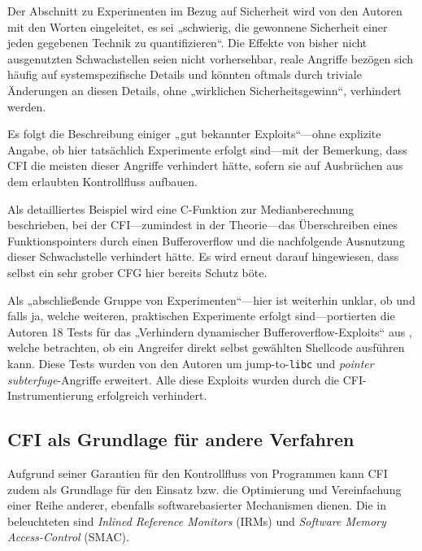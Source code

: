 \documentclass[11pt]{article}
\begin{document}
Der Abschnitt zu Experimenten im Bezug auf Sicherheit wird von den Autoren mit
den Worten eingeleitet, es sei „schwierig, die gewonnene Sicherheit einer jeden
gegebenen Technik zu quantifizieren“. Die Effekte von bisher nicht ausgenutzten
Schwachstellen seien nicht vorhersehbar, reale Angriffe bezögen sich häufig auf
systemspezifische Details und könnten oftmals durch triviale Änderungen an
diesen Details, ohne „wirklichen Sicherheitsgewinn“, verhindert werden.

Es folgt die Beschreibung einiger „gut bekannter Exploits“—ohne explizite
Angabe, ob hier tatsächlich Experimente erfolgt sind—mit der Bemerkung, dass
CFI die meisten dieser Angriffe verhindert hätte, sofern sie auf Ausbrüchen aus
dem erlaubten Kontrollfluss aufbauen.

Als detailliertes Beispiel wird eine C-Funktion zur Medianberechnung
beschrieben, bei der CFI—zumindest in der Theorie—das Überschreiben eines
Funktionspointers durch einen Bufferoverflow und die nachfolgende Ausnutzung
dieser Schwachstelle verhindert hätte. Es wird erneut darauf hingewiesen, dass
selbst ein sehr grober CFG hier bereits Schutz böte.

Als „abschließende Gruppe von Experimenten“—hier ist weiterhin unklar, ob und
falls ja, welche weiteren, praktischen Experimente erfolgt sind—portierten die
Autoren 18 Tests für das „Verhindern dynamischer Bufferoverflow-Exploits“ aus
\cite{wilander2003comparison}, welche betrachten, ob ein Angreifer direkt
selbst gewählten Shellcode ausführen kann. Diese Tests wurden von den Autoren
um jump-to-\texttt{libc} und \emph{pointer subterfuge}-Angriffe erweitert. Alle
diese Exploits wurden durch die CFI-Instrumentierung erfolgreich verhindert.

\subsection{CFI als Grundlage für andere Verfahren}

Aufgrund seiner Garantien für den Kontrollfluss von Programmen kann CFI zudem
als Grundlage für den Einsatz bzw. die Optimierung und Vereinfachung einer
Reihe anderer, ebenfalls softwarebasierter Mechanismen dienen. Die in
\cite{abadi-2009-control-tissec} beleuchteten sind \emph{Inlined Reference
Monitors} (IRMs) und \emph{Software Memory Access-Control} (SMAC).


\end{document}
